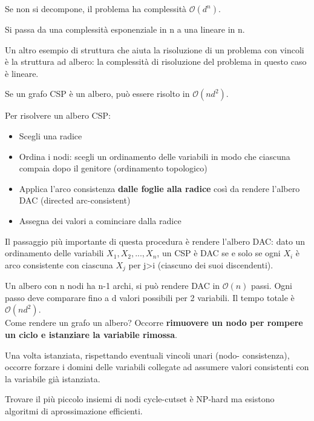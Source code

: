Se non si decompone, il problema ha complessità $\mathcal{O}(d^n)$.

Si passa da una complessità esponenziale in n a una lineare in n.

Un altro esempio di struttura che aiuta la risoluzione di un problema con
vincoli è la struttura ad albero: la complessità di risoluzione del problema
in questo caso è lineare.

Se un grafo CSP è un albero, può essere risolto in $\mathcal{O}(nd^2)$.

Per risolvere un albero CSP:

\begin{itemize}
 \item Scegli una radice
 \item Ordina i nodi: scegli un ordinamento delle variabili in modo che
ciascuna compaia dopo il genitore (ordinamento topologico)
 \item Applica l'arco consistenza \textbf{dalle foglie alla radice}
così da rendere l'albero DAC (directed arc-consistent)
 \item Assegna dei valori a cominciare dalla radice
\end{itemize}

Il passaggio più importante di questa procedura è rendere l'albero
DAC: dato un ordinamento delle variabili $X_1, X_2, ..., X_n$,
un CSP è DAC se e solo se ogni $X_i$ è arco consistente
con ciascuna $X_j$ per j>i (ciascuno dei suoi discendenti).

Un albero con n nodi ha n-1 archi, si può rendere DAC in
$\mathcal{O}(n)$ passi. Ogni passo deve comparare fino a
d valori possibili per 2 variabili. Il tempo totale è
$\mathcal{O}(nd^2)$.\\

Come rendere un grafo un albero? Occorre \textbf{rimuovere un nodo
per rompere un ciclo e istanziare la variabile rimossa}.

Una volta istanziata, rispettando eventuali vincoli unari (nodo-
consistenza), occorre forzare i domini delle variabili collegate
ad assumere valori consistenti con la variabile già istanziata.

Trovare il più piccolo insiemi di nodi cycle-cutset è NP-hard
ma esistono algoritmi di aprossimazione efficienti.
